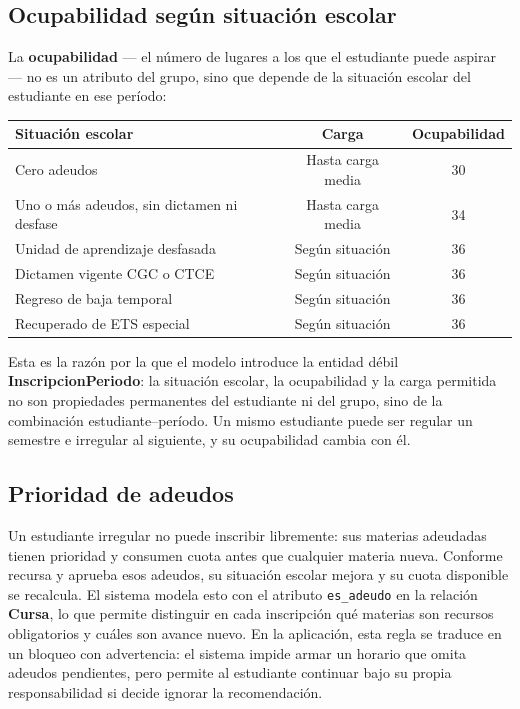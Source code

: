 \documentclass[11pt,letterpaper]{article}
\begin{document}
\subsection{Ocupabilidad según situación escolar}

La \textbf{ocupabilidad} --- el número de lugares a los que el estudiante puede aspirar --- no es un atributo del grupo, sino que depende de la situación escolar del estudiante en ese período:

\begin{center}
\begin{tabular}{lcc}
\toprule
\textbf{Situación escolar} & \textbf{Carga} & \textbf{Ocupabilidad} \\
\midrule
Cero adeudos & Hasta carga media & 30 \\
Uno o más adeudos, sin dictamen ni desfase & Hasta carga media & 34 \\
Unidad de aprendizaje desfasada & Según situación & 36 \\
Dictamen vigente CGC o CTCE & Según situación & 36 \\
Regreso de baja temporal & Según situación & 36 \\
Recuperado de ETS especial & Según situación & 36 \\
\bottomrule
\end{tabular}
\end{center}

Esta es la razón por la que el modelo introduce la entidad débil \textbf{InscripcionPeriodo}: la situación escolar, la ocupabilidad y la carga permitida no son propiedades permanentes del estudiante ni del grupo, sino de la combinación estudiante--período. Un mismo estudiante puede ser regular un semestre e irregular al siguiente, y su ocupabilidad cambia con él.

\subsection{Prioridad de adeudos}

Un estudiante irregular no puede inscribir libremente: sus materias adeudadas tienen prioridad y consumen cuota antes que cualquier materia nueva. Conforme recursa y aprueba esos adeudos, su situación escolar mejora y su cuota disponible se recalcula. El sistema modela esto con el atributo \texttt{es\_adeudo} en la relación \textbf{Cursa}, lo que permite distinguir en cada inscripción qué materias son recursos obligatorios y cuáles son avance nuevo. En la aplicación, esta regla se traduce en un bloqueo con advertencia: el sistema impide armar un horario que omita adeudos pendientes, pero permite al estudiante continuar bajo su propia responsabilidad si decide ignorar la recomendación.
\end{document}
